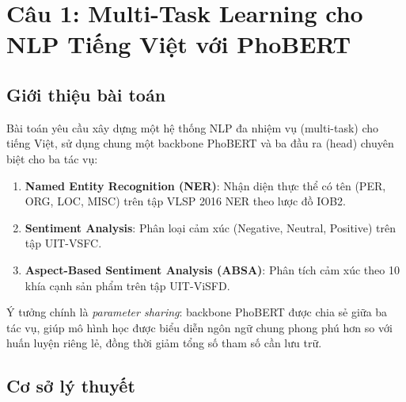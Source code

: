 
\section{Câu 1: Multi-Task Learning cho NLP Tiếng Việt với PhoBERT}
\label{sec:cau1}

\subsection{Giới thiệu bài toán}

Bài toán yêu cầu xây dựng một hệ thống NLP đa nhiệm vụ (multi-task) cho tiếng Việt,
sử dụng chung một backbone PhoBERT và ba đầu ra (head) chuyên biệt cho ba tác vụ:

\begin{enumerate}
    \item \textbf{Named Entity Recognition (NER)}: Nhận diện thực thể có tên (PER, ORG, LOC, MISC) trên tập VLSP 2016 NER theo lược đồ IOB2.
    \item \textbf{Sentiment Analysis}: Phân loại cảm xúc (Negative, Neutral, Positive) trên tập UIT-VSFC.
    \item \textbf{Aspect-Based Sentiment Analysis (ABSA)}: Phân tích cảm xúc theo 10 khía cạnh sản phẩm trên tập UIT-ViSFD.
\end{enumerate}

Ý tưởng chính là \emph{parameter sharing}: backbone PhoBERT được chia sẻ giữa ba tác vụ,
giúp mô hình học được biểu diễn ngôn ngữ chung phong phú hơn so với huấn luyện riêng lẻ,
đồng thời giảm tổng số tham số cần lưu trữ.

\subsection{Cơ sở lý thuyết}

